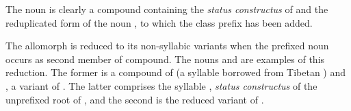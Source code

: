 The noun  is clearly a compound containing the \textit{status constructus} of  and the reduplicated form of the noun , to which the class prefix  has been added. 

The allomorph  is reduced to its non-syllabic variants  when the prefixed noun occurs as second member of compound. The nouns  and  are examples of this reduction. The former is a compound of  (a syllable borrowed  from Tibetan ) and , a variant of . The latter comprises the syllable , \textit{status constructus} of the unprefixed root of , and the second  is the reduced variant of .

